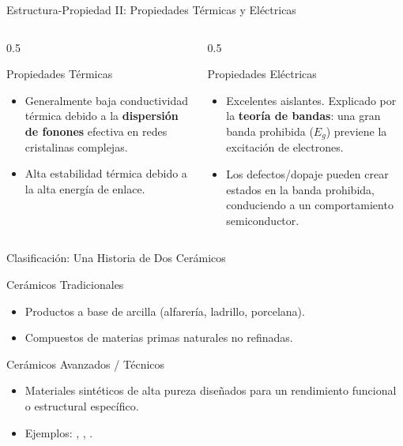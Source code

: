 \begin{frame}{Estructura-Propiedad II: Propiedades Térmicas y Eléctricas}
	\begin{columns}[T]
		\begin{column}{0.5\textwidth}
			\begin{block}{Propiedades Térmicas}
				\begin{itemize}
					\item Generalmente baja conductividad térmica debido a la
						\textbf{dispersión de fonones} efectiva en redes cristalinas
						complejas.
					\item Alta estabilidad térmica debido a la alta energía de enlace.
				\end{itemize}
			\end{block}
		\end{column}
		\begin{column}{0.5\textwidth}
			\begin{block}{Propiedades Eléctricas}
				\begin{itemize}
					\item Excelentes aislantes. Explicado por la \textbf{teoría de
						bandas}: una gran banda prohibida ($E_g$) previene la excitación de
						electrones.
					\item Los defectos/dopaje pueden crear estados en la banda prohibida,
						conduciendo a un comportamiento semiconductor.
				\end{itemize}
			\end{block}
		\end{column}
	\end{columns}
\end{frame}

\begin{frame}{Clasificación: Una Historia de Dos Cerámicos}
	\begin{block}{Cerámicos Tradicionales}
		\begin{itemize}
			\item Productos a base de arcilla (alfarería, ladrillo, porcelana).
			\item Compuestos de materias primas naturales no refinadas.
		\end{itemize}
	\end{block}
	\vspace{1cm}
	\begin{alertblock}{Cerámicos Avanzados / Técnicos}
		\begin{itemize}
			\item Materiales sintéticos de alta pureza diseñados para un rendimiento
				funcional o estructural específico.
			\item Ejemplos: , , .
		\end{itemize}
	\end{alertblock}
\end{frame}
